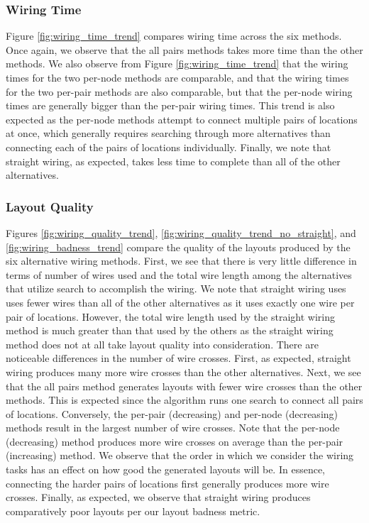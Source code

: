 \subsubsection{Wiring Time}
Figure \ref{fig:wiring_time_trend} compares wiring time across
the six methods. Once again, we observe that the all pairs methods takes
more time than the other methods. We also observe from Figure
\ref{fig:wiring_time_trend} that the wiring times for the two per-node methods
are comparable, and that the wiring times for the two per-pair methods are also
comparable, but that the per-node wiring times are generally bigger than the
per-pair wiring times. This trend is also expected as the per-node methods
attempt to connect multiple pairs of locations at once, which generally requires
searching through more alternatives than
connecting each of the pairs of locations individually.
Finally, we note that straight wiring, as expected, takes less time to complete
than all of the other alternatives.

\subsubsection{Layout Quality}
Figures \ref{fig:wiring_quality_trend},
\ref{fig:wiring_quality_trend_no_straight}, and \ref{fig:wiring_badness_trend}
compare the
quality of the layouts produced by the six alternative wiring methods. First,
we see that there is very
little difference in terms of number of wires used and the total wire length
among the alternatives that utilize search to accomplish the wiring. We note
that straight wiring uses uses fewer wires than all of the other alternatives
as it uses exactly one wire per pair of locations.
However, the total wire length used by the straight wiring method is much greater
than that used by the others as the straight wiring method does not at all take
layout quality into consideration.
There are noticeable differences in the number of wire crosses. First,
as expected, straight
wiring produces many more wire crosses than the other alternatives. Next, we see
that the all pairs method generates layouts with fewer wire crosses than
the other methods. This is expected since the algorithm runs one search to
connect all pairs of locations. Conversely, the per-pair (decreasing) and
per-node (decreasing) methods
result in the largest number of wire crosses. Note that
the per-node (decreasing) method produces more wire crosses on average than the
per-pair (increasing) method.
We observe that the order in which we consider the wiring tasks
has an effect on how good the generated layouts will be.
In essence, connecting the harder pairs of locations first generally produces
more wire crosses.
Finally, as expected, we observe that straight wiring produces comparatively
poor layouts per our layout badness metric.

